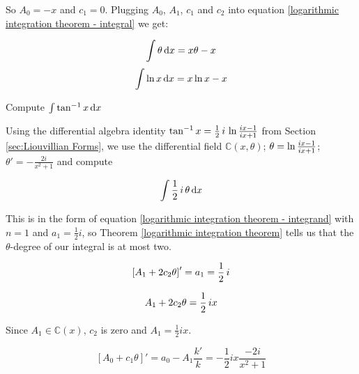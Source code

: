 So $A_0 = -x$ and $c_1 = 0$.  Plugging $A_0$, $A_1$, $c_1$ and $c_2$ into
equation \eqref{logarithmic integration theorem - integral} we get:

$$\int \theta \,\mathrm{d} x = x\theta - x$$
$$\int \ln x \,{\rm d}x = x \ln x - x$$

\endexample

\vfill\eject

\example Compute $\int \tan^{-1} x\, {\rm d}x$

\begin{comment}

The ``standard'' approach to this integral would be to note that the
derivative of $\tan^{-1} x$ is $1/(x^2+1)$ and use integration by parts:

$$\int \tan^{-1} x\, {\rm d}x = x\, \tan^{-1}x - \int \frac{x\, {\rm d}x}{x^2+1}
= x\, \tan^{-1}x - \ln(x^2+1) + C$$

\end{comment}

Using the differential algebra identity $\tan^{-1} x =
{1\over2}\,i\,\ln {{ix-1}\over{ix+1}}$ from
Section \ref{sec:Liouvillian Forms}, we use the differential field
${\mathbb C}(x,\theta)$; $\theta = \ln {{ix-1}\over{ix+1}}$; $\theta'
= - \frac{2i}{x^2+1}$ and compute


$$\int {1\over2}\,i\,\theta\, {\rm d}x$$

This is in the form of equation \eqref{logarithmic integration theorem - integrand}
with $n=1$ and $a_1=\frac{1}{2}i$, so
Theorem \ref{logarithmic integration theorem} tells us that
the $\theta$-degree of our integral is at most two.

$$\left[ A_1 + 2 c_2 \theta \right]' = a_1 = {1\over2}\,i$$

$$A_1 + 2 c_2 \theta = {1\over2}\,i x$$

Since $A_1 \in {\mathbb C}(x)$, $c_2$ is zero and $A_1 = \frac{1}{2}ix$.

$$\left[ A_0 + c_1 \theta \right]' = a_0 - A_1 \frac{k'}{k} = - \frac{1}{2}ix \frac{-2i}{x^2+1}$$

\begin{comment}
Integrating both sides we obtain:

$$c_2\theta + a_1 = {1\over2}\,i\,x + c_1$$

Equating coefficients again (and remembering that
$a_1 \in {\mathbb C}(x)$) leads us to conclude that

$$c_2=0 \qquad a_1 = {1\over2}\,i\,x + c_1$$

Finally,

$$a_1\theta' + a_0' = 0$$
$$\left({1\over2}\,i\,x + c_1\right)\theta' + a_0' = 0$$

Since $c_1$ is unknown, we'll leave it on the left-hand side along
with the unknown $a_0$ and move all of our knowns to the right-hand
side, taking advantage of our knowledge of $\theta'$:

$$c_1\theta' + a_0' = {1\over2}\,i\,x \frac{2i}{x^2+1}$$
\end{comment}

